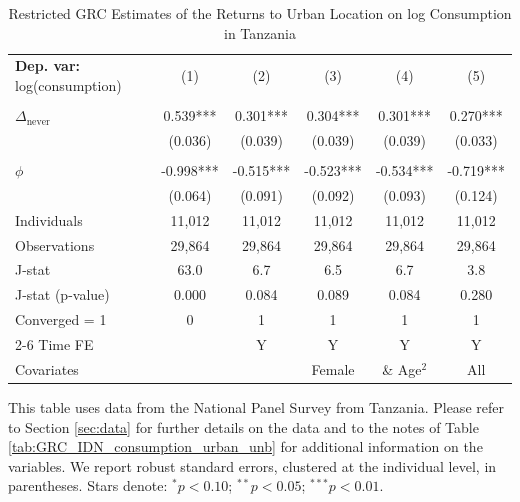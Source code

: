 \begin{table}[htbp] \centering \begin{threeparttable}
 \caption{Restricted GRC Estimates of the Returns to Urban Location on log Consumption in Tanzania} 
 \label{tab:GRC_TZA_consumption_urban_unb} 
\begin{tabular}{l ccccc} \toprule  \textbf{Dep. var:}  log(consumption) 
                    &\multicolumn{1}{c}{(1)}   &\multicolumn{1}{c}{(2)}   &\multicolumn{1}{c}{(3)}   &\multicolumn{1}{c}{(4)}   &\multicolumn{1}{c}{(5)}   \\
                    &               &               &               &               &               \\
$\Delta_{\text{never}}$&       0.539***&       0.301***&       0.304***&       0.301***&       0.270***\\
                    &     (0.036)   &     (0.039)   &     (0.039)   &     (0.039)   &     (0.033)   \\
                    &               &               &               &               &               \\
$\phi$              &      -0.998***&      -0.515***&      -0.523***&      -0.534***&      -0.719***\\
                    &     (0.064)   &     (0.091)   &     (0.092)   &     (0.093)   &     (0.124)   \\
\addlinespace
Individuals         &      11,012   &      11,012   &      11,012   &      11,012   &      11,012   \\
Observations        &      29,864   &      29,864   &      29,864   &      29,864   &      29,864   \\
J-stat              &        63.0   &         6.7   &         6.5   &         6.7   &         3.8   \\
J-stat (p-value)    &       0.000   &       0.084   &       0.089   &       0.084   &       0.280   \\
Converged = 1       &           0   &           1   &           1   &           1   &           1   \\
\cmidrule{2-6} Time FE & & Y & Y & Y & Y \\ Covariates & & & Female & \& Age$^2$ & All \\ \bottomrule \end{tabular} \begin{tablenotes} \footnotesize \item{This table uses data from the National Panel Survey from Tanzania. Please refer to Section \ref{sec:data} for further details on the data and to the notes of Table \ref{tab:GRC_IDN_consumption_urban_unb} for additional information on the variables. We report robust standard errors, clustered at the individual level, in parentheses. Stars denote: $^{*} p<0.10$; $^{**} p<0.05$; $^{***} p<0.01$.} \end{tablenotes} \end{threeparttable} \end{table}
